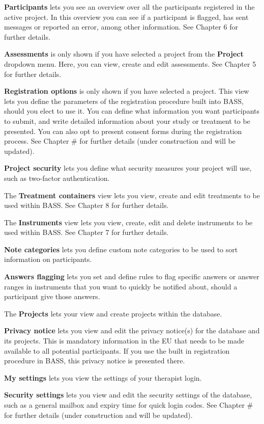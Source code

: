 \documentclass[]{book}
\begin{document}
\textbf{Participants} lets you see an overview over all the participants registered in the active project. In this overview you can see if a participant is flagged, has sent messages or reported an error, among other information. See Chapter 6 for further details.

\textbf{Assessments} is only shown if you have selected a project from the \textbf{Project} dropdown menu. Here, you can view, create and edit assessments. See Chapter 5 for further details.

\textbf{Registration options} is only shown if you have selected a project. This view lets you define the parameters of the registration procedure built into BASS, should you elect to use it. You can define what information you want participants to submit, and write detailed information about your study or treatment to be presented. You can also opt to present consent forms during the registration process. See Chapter \# for further details (under construction and will be updated).

\textbf{Project security} lets you define what security measures your project will use, such as two-factor authentication.

The \textbf{Treatment containers} view lets you view, create and edit treatments to be used within BASS. See Chapter 8 for further details.

The \textbf{Instruments} view lets you view, create, edit and delete instruments to be used within BASS. See Chapter 7 for further details.

\textbf{Note categories} lets you define custom note categories to be used to sort information on participants.

\textbf{Answers flagging} lets you set and define rules to flag specific answers or answer ranges in instruments that you want to quickly be notified about, should a participant give those answers.

The \textbf{Projects} lets your view and create projects within the database.

\textbf{Privacy notice} lets you view and edit the privacy notice(s) for the database and its projects. This is mandatory information in the EU that needs to be made available to all potential participants. If you use the built in registration procedure in BASS, this privacy notice is presented there.

\textbf{My settings} lets you view the settings of your therapist login.

\textbf{Security settings} lets you view and edit the security settings of the database, such as a general mailbox and expiry time for quick login codes. See Chapter \# for further details (under construction and will be updated).
\end{document}
